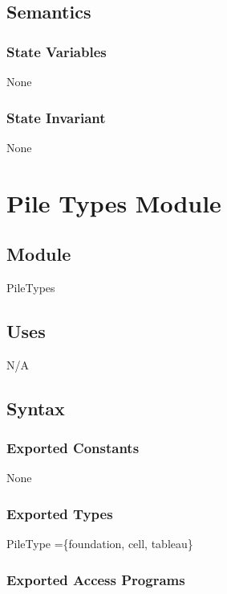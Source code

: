 \documentclass[12pt]{article}
\begin{document}
\subsection* {Semantics}

\subsubsection* {State Variables}

None

\subsubsection* {State Invariant}

None

\newpage

\section* {Pile Types Module}

\subsection*{Module}

PileTypes

\subsection* {Uses}

N/A

\subsection* {Syntax}

\subsubsection* {Exported Constants}

None

\subsubsection* {Exported Types}

PileType =\{foundation, cell, tableau\}

\subsubsection* {Exported Access Programs}
\end{document}
